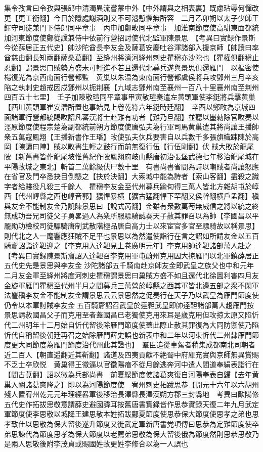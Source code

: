 集令孜言曰令孜與張郎中清濁異流嘗蒙中外【中外謂與之相表裏】既慮玷辱何憚改更【更工衡翻】今日於隱處謝酒則又不可濬慙懼無所容　二月乙卯朔以太子少師王鐸守司徒兼門下侍郎同平章事　丙申加鄭畋同平章事　加淮南節度使高駢東面都統加河東節度使鄭從讜兼侍中依前行營招討使代北監軍陳景思　【考異曰實録作景斯今從薛居正五代史】帥沙陀酋長李友金及薩葛安慶吐谷渾諸部入援京師【帥讀曰率酋慈由翻長知兩翻薩桑葛翻】至絳州將濟河絳州刺史瞿稹亦沙陀也【瞿權俱翻稹止忍翻】謂景思曰賊勢方盛未可輕進不若且還代北募兵遂與景思俱還雁門　以樞密使楊復光為京西南面行營都監　黄巢以朱温為東南面行營都虞侯將兵攻鄧州三月辛亥陷之執刺史趙戒因戍鄧州以扼荆襄【九域志鄧州南至襄州一百八十里襄州南至荆州四百五十七里】　壬子加陳敬瑄同平章事甲寅敬瑄奏遣左黄頭軍使李鋌將兵擊黄巢【西川黄頭軍崔安濳所置也事始見上卷乾符六年鋌時廷翻】　辛酉以鄭畋為京城四面諸軍行營都統賜畋詔凡蕃漢將士赴難有功者【難乃旦翻】並聽以墨勑除官畋奏以涇原節度使程宗楚為副都統前朔方節度使唐弘夫為行軍司馬黄巢遣其將尚讓王播帥衆五萬寇鳳翔【王播新書作王璠】畋使弘夫㐲兵要害自以兵數千多張旗幟踈陳於高岡【陳讀曰陣】賊以畋書生輕之鼓行而前無復行伍【行伍剛翻】伏賊大敗於龍尾陂【新舊書皆作龍尾坡惟舊紀作陂鳳翔府岐山縣唐初治張堡武德七年移治龍尾城在平陽故城之東北】斬首二萬餘級伏尸數十里　有書尚書省間為詩以嘲賊者尚讓怒應在省官及門卒悉抉目倒懸之【抉於決翻】大索城中能為詩者【索山客翻】盡殺之識字者給賤役凡殺三千餘人　瞿稹李友金至代州募兵踰旬得三萬人皆北方雜胡屯於崞西【代州崞縣之西也崞音郭】獷悍暴横【獷古猛翻悍下罕翻又侯幹翻横戶孟翻】稹與友金不能制友金乃說陳景思曰【說式芮翻】金雖有衆數萬苟無威信之將以統之終無成功吾兄司徒父子勇畧過人為衆所服驃騎誠奏天子赦其罪召以為帥【李國昌以平龎勛功檢校司徒驃騎唐制武散階極品唐自高力士以來宦官多官至驃騎故以稱景思】則代北之人一麾響應狂賊不足平也景思以為然遣使詣行在言之詔如所請友金以五百騎齎詔詣達靼迎之【李克用入達靼見上卷廣明元年】李克用帥達靼諸部萬人赴之　【考異曰實録陳景斯齎詔入達靼召李克用軍屯蔚州克用因大掠雁門以北軍鎮薛居正五代史先是景思與李友金沙陀諸部五千騎南赴京師友金即武皇之族父也中和元年二月友金軍至絳州將度河刺史瞿稹謂景思曰巢賊方盛不如且還代北徐圖利害四月友金旋軍雁門瞿稹至代州半月之間募兵三萬營於崞縣之西其軍皆北邊五部之衆不閑軍法瞿稹李友金不能制友金謂景思云云景思然之促奏行在天子乃以武皇為雁門節度使仍令以本軍討賊李友金五百騎齎詔召武皇於逹靼武皇即帥逹靼諸部萬人趨雁門按景思請赦國昌父子而克用至者蓋國昌已老獨使克用來耳是歲克用但攻掠太原又陷忻代二州明年十二月始自忻代留後除雁門節度使蓋此際止赦其罪復為大同防禦使乃陷忻代自稱留後朝廷再召之始除雁門薛史誤也新表中和二年以河東忻代二州隸雁門節度更大同節度為雁門節度治代州此其證也】　羣臣追從車駕者稍集成都南北司朝者近二百人【朝直遥翻近其靳翻】諸道及四夷貢獻不絶蜀中府庫充實與京師無異賞賜不乏士卒欣悦　黄巢得王徽逼以官徽陽瘖不從月餘逃奔河中遣人間道奉絹表詣行在【間古莧翻】詔以徽為兵部尚書　前夏綏節度使諸葛爽復自河陽奉表自歸【去年黄巢入關諸葛爽降之】即以為河陽節度使　宥州刺史拓跋思恭【開元十六年以六胡州殘人置宥州乾元元年理經畧軍後移治長澤縣長澤漢朔方郡三封縣地　考異曰歐陽修五代史作拓拔思敬意謂薛史避國諱耳按舊唐書實録皆作思恭實録天復二年九月武定軍節度使李思敬以城降王建思敬本姓拓跋鄜夏節度使思恭保大節度使思孝之弟也思孝致仕以思敬為保大留後遂升節度又徙武定軍新唐書党項傳曰思恭為定難節度使卒弟思諫代為節度思孝為保大節度以老薦弟思敬為保大留後俄為節度然則思恭思敬乃是兩人思敬後附李茂貞或賜國姓故更姓李修合以為一人誤也